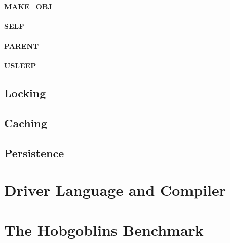 \documentclass[12pt,a4paper]{article}
\let\oldsection\section
\renewcommand\section{\clearpage\oldsection}
\begin{document}
\vspace{2em}\begin{minipage}{\textwidth}
\paragraph{MAKE\_OBJ}
\end{minipage}

\vspace{2em}\begin{minipage}{\textwidth}
\paragraph{SELF}
\end{minipage}

\vspace{2em}\begin{minipage}{\textwidth}
\paragraph{PARENT}
\end{minipage}

\vspace{2em}\begin{minipage}{\textwidth}
\paragraph{USLEEP}
\end{minipage}

\subsection{Locking}\label{sec:locking}

\subsection{Caching}\label{sec:caching}

\subsection{Persistence}\label{sec:persistence}

\section{Driver Language and Compiler}\label{sec:compiler}

\section{The Hobgoblins Benchmark}\label{sec:hobgoblins}

\end{document}
